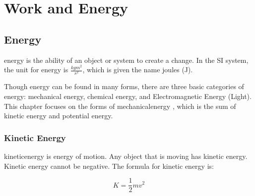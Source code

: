 \chapter{Work and Energy}

	
	\section{Energy}
	\gls{energy} is the ability of an object or system to create a change.  In the SI system, the unit for energy is $\frac{kg m^2}{s ^2}$, which is given the name \gls{joule}s (J).  
	
	Though energy can be found in many forms, there are three basic categories of energy: mechanical energy, chemical energy, and Electromagnetic Energy (Light).  This chapter focuses on the forms of \gls{mechanicalenergy} , which is the sum of kinetic energy and potential energy.  
	
	
	
	
	\subsection{Kinetic Energy}  \label{Kinetic Energy} 
	\gls{kineticenergy} is energy of motion.  Any object that is moving has kinetic energy.  Kinetic energy cannot be negative.  The formula for kinetic energy is: 
		\begin{mdframed}[backgroundcolor=orange!20!white]
		\begin{equation}
		K = \frac{1}{2}mv^2 
		\label{eqn:kineticenergy}
		\end{equation}
	\end{mdframed}
	
	
	
